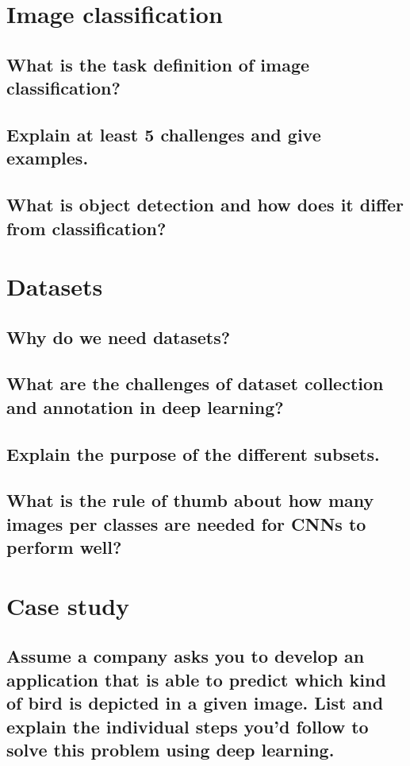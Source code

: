 \section{Image classification}
\subsection{What is the task definition of image classification?}

\subsection{Explain at least 5 challenges and give examples.}

\subsection{What is object detection and how does it differ from classification?}


\section{Datasets}

\subsection{Why do we need datasets?}

\subsection{What are the challenges of dataset collection and annotation in deep learning?}

\subsection{Explain the purpose of the different subsets.}

\subsection{What is the rule of thumb about how many images per classes are needed for CNNs to perform well?}

\section{Case study}

\subsection{Assume a company asks you to develop an application that is able to predict which kind of bird is depicted in a given image. List and explain the individual steps you’d follow to solve this problem using deep learning.}

